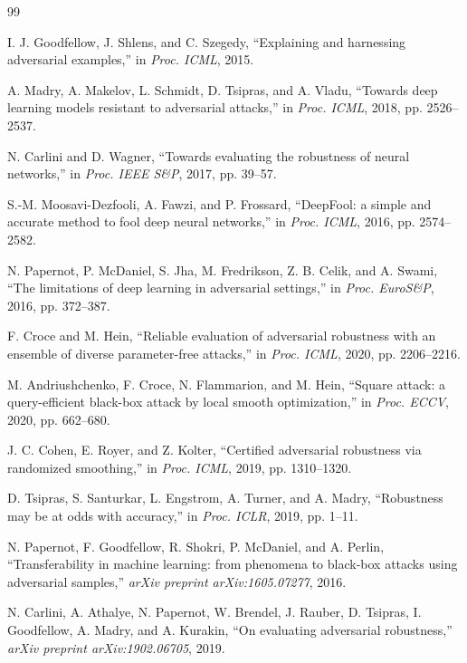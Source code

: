 \documentclass[10pt,conference]{IEEEtran}
\begin{document}
\begin{thebibliography}{99}

 I. J. Goodfellow, J. Shlens, and C. Szegedy, ``Explaining and harnessing adversarial examples,'' in \textit{Proc. ICML}, 2015.

 A. Madry, A. Makelov, L. Schmidt, D. Tsipras, and A. Vladu, ``Towards deep learning models resistant to adversarial attacks,'' in \textit{Proc. ICML}, 2018, pp. 2526--2537.

 N. Carlini and D. Wagner, ``Towards evaluating the robustness of neural networks,'' in \textit{Proc. IEEE S\&P}, 2017, pp. 39--57.

 S.-M. Moosavi-Dezfooli, A. Fawzi, and P. Frossard, ``DeepFool: a simple and accurate method to fool deep neural networks,'' in \textit{Proc. ICML}, 2016, pp. 2574--2582.

 N. Papernot, P. McDaniel, S. Jha, M. Fredrikson, Z. B. Celik, and A. Swami, ``The limitations of deep learning in adversarial settings,'' in \textit{Proc. EuroS\&P}, 2016, pp. 372--387.

 F. Croce and M. Hein, ``Reliable evaluation of adversarial robustness with an ensemble of diverse parameter-free attacks,'' in \textit{Proc. ICML}, 2020, pp. 2206--2216.

 M. Andriushchenko, F. Croce, N. Flammarion, and M. Hein, ``Square attack: a query-efficient black-box attack by local smooth optimization,'' in \textit{Proc. ECCV}, 2020, pp. 662--680.

 J. C. Cohen, E. Royer, and Z. Kolter, ``Certified adversarial robustness via randomized smoothing,'' in \textit{Proc. ICML}, 2019, pp. 1310--1320.

 D. Tsipras, S. Santurkar, L. Engstrom, A. Turner, and A. Madry, ``Robustness may be at odds with accuracy,'' in \textit{Proc. ICLR}, 2019, pp. 1--11.

 N. Papernot, F. Goodfellow, R. Shokri, P. McDaniel, and A. Perlin, ``Transferability in machine learning: from phenomena to black-box attacks using adversarial samples,'' \textit{arXiv preprint arXiv:1605.07277}, 2016.

 N. Carlini, A. Athalye, N. Papernot, W. Brendel, J. Rauber, D. Tsipras, I. Goodfellow, A. Madry, and A. Kurakin, ``On evaluating adversarial robustness,'' \textit{arXiv preprint arXiv:1902.06705}, 2019.


\end{thebibliography}
\end{document}
